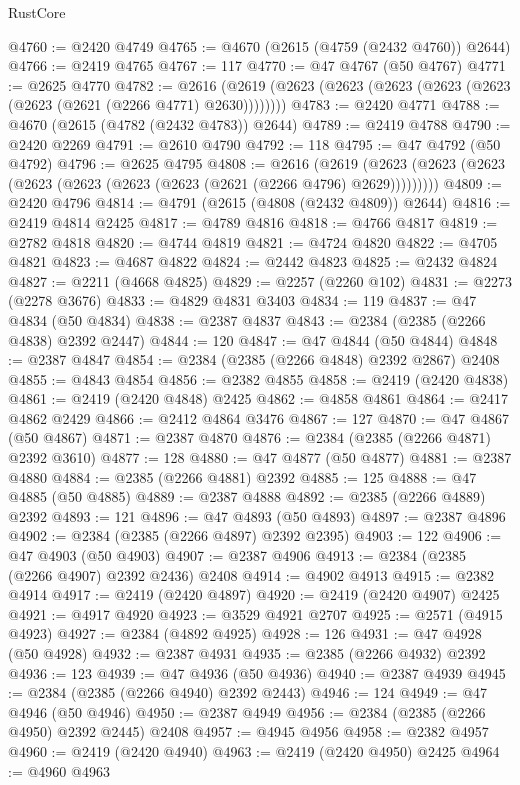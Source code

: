 \begin{lexlean}{RustCore}
\begin{coremodule}
@4760 := @2420 @4749
@4765 := @4670 (@2615 (@4759 (@2432 @4760)) @2644)
@4766 := @2419 @4765
@4767 := 117
@4770 := @47 @4767 (@50 @4767)
@4771 := @2625 @4770
@4782 := @2616 (@2619 (@2623 (@2623 (@2623 (@2623 (@2623 (@2623 (@2621 (@2266 @4771) @2630))))))))
@4783 := @2420 @4771
@4788 := @4670 (@2615 (@4782 (@2432 @4783)) @2644)
@4789 := @2419 @4788
@4790 := @2420 @2269
@4791 := @2610 @4790
@4792 := 118
@4795 := @47 @4792 (@50 @4792)
@4796 := @2625 @4795
@4808 := @2616
    (@2619 (@2623 (@2623 (@2623 (@2623 (@2623 (@2623 (@2623 (@2621 (@2266 @4796) @2629)))))))))
@4809 := @2420 @4796
@4814 := @4791 (@2615 (@4808 (@2432 @4809)) @2644)
@4816 := @2419 @4814 @2425
@4817 := @4789 @4816
@4818 := @4766 @4817
@4819 := @2782 @4818
@4820 := @4744 @4819
@4821 := @4724 @4820
@4822 := @4705 @4821
@4823 := @4687 @4822
@4824 := @2442 @4823
@4825 := @2432 @4824
@4827 := @2211 (@4668 @4825)
@4829 := @2257 (@2260 @102)
@4831 := @2273 (@2278 @3676)
@4833 := @4829 @4831 @3403
@4834 := 119
@4837 := @47 @4834 (@50 @4834)
@4838 := @2387 @4837
@4843 := @2384 (@2385 (@2266 @4838) @2392 @2447)
@4844 := 120
@4847 := @47 @4844 (@50 @4844)
@4848 := @2387 @4847
@4854 := @2384 (@2385 (@2266 @4848) @2392 @2867) @2408
@4855 := @4843 @4854
@4856 := @2382 @4855
@4858 := @2419 (@2420 @4838)
@4861 := @2419 (@2420 @4848) @2425
@4862 := @4858 @4861
@4864 := @2417 @4862 @2429
@4866 := @2412 @4864 @3476
@4867 := 127
@4870 := @47 @4867 (@50 @4867)
@4871 := @2387 @4870
@4876 := @2384 (@2385 (@2266 @4871) @2392 @3610)
@4877 := 128
@4880 := @47 @4877 (@50 @4877)
@4881 := @2387 @4880
@4884 := @2385 (@2266 @4881) @2392
@4885 := 125
@4888 := @47 @4885 (@50 @4885)
@4889 := @2387 @4888
@4892 := @2385 (@2266 @4889) @2392
@4893 := 121
@4896 := @47 @4893 (@50 @4893)
@4897 := @2387 @4896
@4902 := @2384 (@2385 (@2266 @4897) @2392 @2395)
@4903 := 122
@4906 := @47 @4903 (@50 @4903)
@4907 := @2387 @4906
@4913 := @2384 (@2385 (@2266 @4907) @2392 @2436) @2408
@4914 := @4902 @4913
@4915 := @2382 @4914
@4917 := @2419 (@2420 @4897)
@4920 := @2419 (@2420 @4907) @2425
@4921 := @4917 @4920
@4923 := @3529 @4921 @2707
@4925 := @2571 (@4915 @4923)
@4927 := @2384 (@4892 @4925)
@4928 := 126
@4931 := @47 @4928 (@50 @4928)
@4932 := @2387 @4931
@4935 := @2385 (@2266 @4932) @2392
@4936 := 123
@4939 := @47 @4936 (@50 @4936)
@4940 := @2387 @4939
@4945 := @2384 (@2385 (@2266 @4940) @2392 @2443)
@4946 := 124
@4949 := @47 @4946 (@50 @4946)
@4950 := @2387 @4949
@4956 := @2384 (@2385 (@2266 @4950) @2392 @2445) @2408
@4957 := @4945 @4956
@4958 := @2382 @4957
@4960 := @2419 (@2420 @4940)
@4963 := @2419 (@2420 @4950) @2425
@4964 := @4960 @4963

\end{coremodule}
\end{lexlean}
